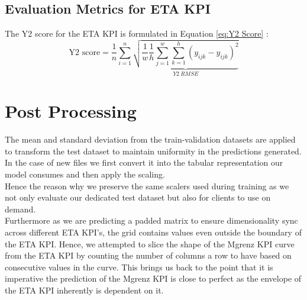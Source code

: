 \documentclass{report} %
\begin{document}
\subsection{Evaluation Metrics for ETA \ac{KPI}}\label{sec:Evaluation Metrics for 3D KPI}

The Y2 score for the ETA \ac{KPI} is formulated in Equation \ref{eq:Y2 Score} :
\begin{equation}
    \text{Y2 score} = \frac{1}{n} \sum_{i=1}^{n} \underbrace{ \sqrt{\frac{1}{w} \frac{1}{h} \sum_{j=1}^{w} \sum_{k=1}^{h} (y_{ijk} - \hat{y}_{ijk})^2}}_{Y2\ RMSE}
    \label{eq:Y2 Score}
\end{equation}
    


\vspace{0.2cm} %

\section{Post Processing}\label{sec:Post Processing}

The mean and standard deviation from the train-validation datasets are applied to transform the test dataset to maintain uniformity in the predictions generated.
In the case of new files we first convert it into the tabular representation our model consumes and then apply the scaling.\\
Hence the reason why we preserve the same scalers used during training as we not only evaluate our dedicated test dataset but also for clients to use on demand. \\

Furthermore as we are predicting a padded matrix to ensure dimensionality sync across different ETA \ac{KPI}'s, the grid contains values even outside the boundary of the ETA \ac{KPI}.
Hence, we attempted to slice the shape of the Mgrenz \ac{KPI} curve from the ETA \ac{KPI} by counting the number of columns a row to have based on consecutive values in the curve.
This brings us back to the point that it is imperative the prediction of the Mgrenz \ac{KPI} is close to perfect as the envelope of the ETA \ac{KPI} inherently is dependent on it.
\end{document}
